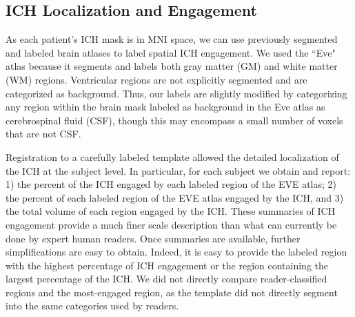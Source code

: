 \documentclass[10pt]{article}\usepackage[]{graphicx}\usepackage[]{color}
\begin{document}
\subsection{ICH Localization and Engagement}
\label{sec:engage}
As each patient's ICH mask is in MNI space, we can use previously segmented and labeled brain atlases to label spatial ICH engagement.  
We used the ``Eve" atlas \citep{oishi_human_2008} because it segments and labels both gray matter (GM) and white matter (WM) regions.  Ventricular regions are not explicitly segmented and are categorized as background.  Thus, our labels are slightly modified by categorizing any region within the brain mask labeled as background in the Eve atlas as cerebrospinal fluid (CSF), though this may encompass a small number of voxels that are not CSF.  

Registration to a carefully labeled template allowed the detailed localization of the ICH at the subject level. In particular, for each subject we obtain and report: 1) the percent of the ICH engaged by each labeled region of the EVE atlas; 2) the percent of each labeled region of the EVE atlas engaged by the ICH, and 3) the total volume of each region engaged by the ICH. 
These summaries of ICH engagement provide a much finer scale description than what can currently be done by expert human readers.  Once summaries are available, further simplifications are easy to obtain. Indeed, it is easy to provide the labeled region with the highest percentage of ICH engagement or the region containing the largest percentage of the ICH. We did not directly compare reader-classified regions and the most-engaged region, as the template did not directly segment into the same categories used by readers.
\end{document}
